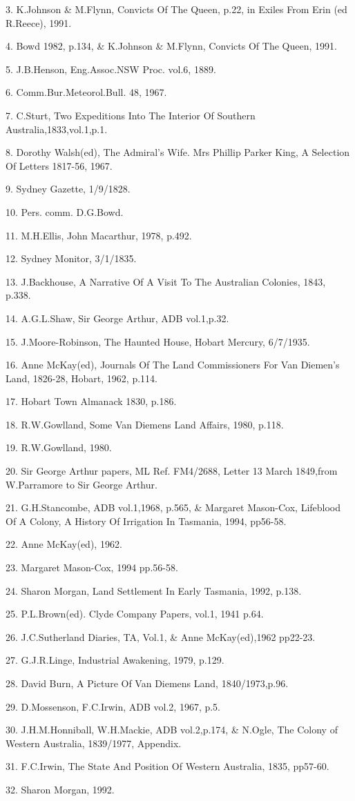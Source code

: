 3. K.Johnson \& M.Flynn, Convicts Of The Queen, p.22, in Exiles From
     Erin (ed R.Reece), 1991.

4. Bowd 1982, p.134, \& K.Johnson \& M.Flynn, Convicts Of The Queen, 1991.

5. J.B.Henson, Eng.Assoc.NSW Proc. vol.6, 1889.

6. Comm.Bur.Meteorol.Bull. 48, 1967.

7. C.Sturt, Two Expeditions Into The Interior Of Southern
   Australia,1833,vol.1,p.1.

8. Dorothy Walsh(ed), The Admiral's Wife. Mrs Phillip Parker King, A
    Selection Of Letters 1817-56, 1967.

9. Sydney Gazette, 1/9/1828.

10. Pers. comm. D.G.Bowd.

11. M.H.Ellis, John Macarthur, 1978, p.492.

12. Sydney Monitor, 3/1/1835.

13. J.Backhouse, A Narrative Of A Visit To The Australian Colonies,
    1843, p.338.

14. A.G.L.Shaw, Sir George Arthur, ADB vol.1,p.32.

15. J.Moore-Robinson, The Haunted House, Hobart Mercury, 6/7/1935.

16. Anne McKay(ed), Journals Of The Land Commissioners For Van
      Diemen's Land, 1826-28, Hobart, 1962, p.114.

17. Hobart Town Almanack 1830, p.186.

18. R.W.Gowlland, Some Van Diemens Land Affairs, 1980, p.118.

19. R.W.Gowlland, 1980.

20. Sir George Arthur papers, ML Ref. FM4/2688, Letter 13 March
      1849,from W.Parramore to Sir George Arthur.

21. G.H.Stancombe, ADB vol.1,1968, p.565, \& Margaret Mason-Cox,
      Lifeblood Of A Colony, A History Of Irrigation In Tasmania,
      1994, pp56-58.

22. Anne McKay(ed), 1962.

23. Margaret Mason-Cox, 1994 pp.56-58.

24. Sharon Morgan, Land Settlement In Early Tasmania, 1992, p.138.

25. P.L.Brown(ed). Clyde Company Papers, vol.1, 1941 p.64.

26. J.C.Sutherland Diaries, TA, Vol.1, \& Anne McKay(ed),1962  pp22-23.

27. G.J.R.Linge, Industrial Awakening, 1979, p.129.			

28. David Burn, A Picture Of Van Diemens Land, 1840/1973,p.96.

29. D.Mossenson, F.C.Irwin, ADB vol.2, 1967, p.5.

30. J.H.M.Honniball, W.H.Mackie, ADB vol.2,p.174, \& N.Ogle, The Colony
      of Western Australia, 1839/1977, Appendix.

31. F.C.Irwin, The State And Position Of Western Australia, 1835, pp57-60.

32. Sharon Morgan, 1992.

